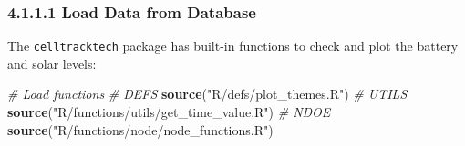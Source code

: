 \documentclass[
]{book}
\newenvironment{Shaded}{\begin{snugshade}}{\end{snugshade}}
\newcommand{\CommentTok}[1]{\textcolor[rgb]{0.56,0.35,0.01}{\textit{#1}}}
\newcommand{\FunctionTok}[1]{\textcolor[rgb]{0.13,0.29,0.53}{\textbf{#1}}}
\newcommand{\NormalTok}[1]{#1}
\newcommand{\StringTok}[1]{\textcolor[rgb]{0.31,0.60,0.02}{#1}}
\begin{document}
\subsubsection{4.1.1.1 Load Data from Database}\label{load-data-from-database}

The \texttt{celltracktech} package has built-in functions to check and plot the battery and solar levels:

\begin{Shaded}
\begin{Highlighting}[]
\CommentTok{\# Load functions}
\CommentTok{\# DEFS}
\FunctionTok{source}\NormalTok{(}\StringTok{"R/defs/plot\_themes.R"}\NormalTok{)}
\CommentTok{\# UTILS}
\FunctionTok{source}\NormalTok{(}\StringTok{"R/functions/utils/get\_time\_value.R"}\NormalTok{)}
\CommentTok{\# NDOE}
\FunctionTok{source}\NormalTok{(}\StringTok{"R/functions/node/node\_functions.R"}\NormalTok{)}
\end{Highlighting}
\end{Shaded}
\end{document}
